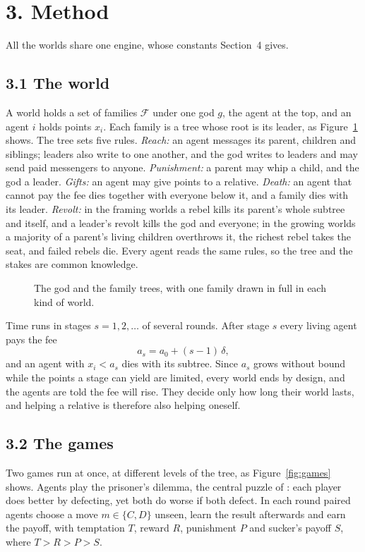 \section*{3. Method}
All the worlds share one engine, whose constants Section~4 gives.

\subsection*{3.1 The world}
A world holds a set of families $\mathcal{F}$ under one god $g$, the agent at the top, and an agent $i$ holds points $x_i$. Each family is a tree whose root is its leader, as Figure~\ref{fig:tree} shows. The tree sets five rules. \textit{Reach:} an agent messages its parent, children and siblings; leaders also write to one another, and the god writes to leaders and may send paid messengers to anyone. \textit{Punishment:} a parent may whip a child, and the god a leader. \textit{Gifts:} an agent may give points to a relative. \textit{Death:} an agent that cannot pay the fee dies together with everyone below it, and a family dies with its leader. \textit{Revolt:} in the framing worlds a rebel kills its parent's whole subtree and itself, and a leader's revolt kills the god and everyone; in the growing worlds a majority of a parent's living children overthrows it, the richest rebel takes the seat, and failed rebels die. Every agent reads the same rules, so the tree and the stakes are common knowledge.

\begin{figure}[!htbp]
\centering
\resizebox{0.6\linewidth}{!}{}
\caption{The god and the family trees, with one family drawn in full in each kind of world.}
\label{fig:tree}
\end{figure}

Time runs in stages $s = 1, 2, \dots$ of several rounds. After stage $s$ every living agent pays the fee
\begin{equation}
  a_s = a_0 + (s-1)\,\delta ,
  \label{eq:fee}
\end{equation}
and an agent with $x_i < a_s$ dies with its subtree. Since $a_s$ grows without bound while the points a stage can yield are limited, every world ends by design, and the agents are told the fee will rise. They decide only how long their world lasts, and helping a relative is therefore also helping oneself.

\subsection*{3.2 The games}
Two games run at once, at different levels of the tree, as Figure~\ref{fig:games} shows. Agents play the prisoner's dilemma, the central puzzle of \citet{dixit2008art}: each player does better by defecting, yet both do worse if both defect. In each round paired agents choose a move $m \in \{C, D\}$ unseen, learn the result afterwards and earn the payoff, with temptation $T$, reward $R$, punishment $P$ and sucker's payoff $S$, where $T > R > P > S$.

